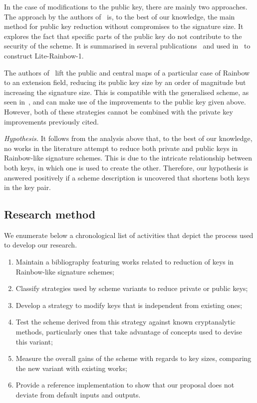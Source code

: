 \documentclass[openright]{report}
\begin{document}
In the case of modifications to the public key, there are mainly two approaches.
The approach by the authors of~\cite{Petzoldt:201006:inproc} is, to the best of 
our knowledge, the main method for public key reduction without compromises to
the signature size. It explores the fact that specific parts of the public key
do not contribute to the security of the scheme. It is summarised in several
publications~\cite{Petzoldt:201012:inproc,Petzoldt:201103:inproc,Petzoldt:201211:inproc,Petzoldt:201307:phd}
and used in~\cite{Shim:201512:inproc} to construct Lite-Rainbow-1.

The authors of~\cite{Szepieniec:201706:inproc} lift the public and central maps
of a particular case of Rainbow to an extension field, reducing its public 
key size by an order of magnitude but increasing the signature size. This is 
compatible with the generalised scheme, as seen in~\cite{Beullens:201706:msc,Beullens:201712:inproc},
and can make use of the improvements to the public key given above. However,
both of these strategies cannot be combined with the private key improvements
previously cited. 

\emph{Hypothesis.} It follows from the analysis above that, to the best of our knowledge, no works in the literature attempt to reduce both private and public keys in Rainbow-like signature schemes. This is due to the intricate relationship between both keys, in which one is used to create the other. Therefore, our hypothesis is answered positively if a scheme description is uncovered that shortens both keys in the key pair.

\subsection{Research method}

We enumerate below a chronological list of activities that depict the process used to develop our research.

\begin{enumerate}[label=(\roman*), itemsep=1pt]
    \item Maintain a bibliography featuring works related to reduction of keys in Rainbow-like signature schemes;
    \item Classify strategies used by scheme variants to reduce private or public keys;
    \item Develop a strategy to modify keys that is independent from existing ones;
    \item Test the scheme derived from this strategy against known cryptanalytic methods, particularly ones that take advantage of concepts used to devise this variant;
    \item Measure the overall gains of the scheme with regards to key sizes, comparing the new variant with existing works;
    \item Provide a reference implementation to show that our proposal does not deviate from default inputs and outputs.
\end{enumerate}
\end{document}
